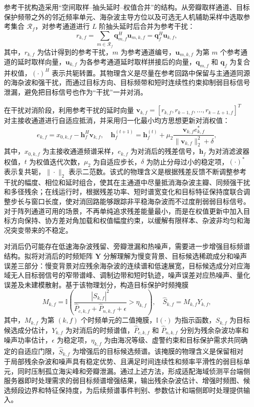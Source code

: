 参考干扰构造采用“空间取样--抽头延时--权值合并”的结构。从旁瓣取样通道、目标保护频带之外的邻近频率单元、海杂波主导方位以及可选无人机辅助采样中选取参考集合 $\mathcal{R}_{f}$，对参考通道进行 $L$ 阶抽头延时后合并为参考干扰：
\begin{equation}
	r_{k,f}=\sum_{m\in\mathcal{R}_{f}}\mathbf{q}_{m,f}^{H}\mathbf{u}_{m,k,f}
	=\mathbf{q}_{f}^{H}\mathbf{u}_{k,f},
\end{equation}
其中，$r_{k,f}$ 为估计得到的参考干扰，$m$ 为参考通道编号，$\mathbf{u}_{m,k,f}$ 为第 $m$ 个参考通道的延时取样向量，$\mathbf{u}_{k,f}$ 为各参考通道延时取样拼接后的向量，$\mathbf{q}_{m,f}$ 和 $\mathbf{q}_{f}$ 为复合并权值，$(\cdot)^H$ 表示共轭转置。其物理含义是尽量在参考回路中保留与主通道同源的海杂波和强干扰，而通过目标方向、目标频带和短时连续性约束抑制弱目标信号泄漏，避免把目标信号也作为“干扰”一并对消。

在干扰对消阶段，利用参考干扰的延时向量 $\mathbf{v}_{k,f}=[r_{k,f},r_{k-1,f},\ldots,r_{k-L+1,f}]^T$ 对主接收通道进行自适应抵消，并采用归一化最小均方思想更新对消权值：
\begin{equation}
	e_{k,f}=x_{0,k,f}-\mathbf{h}_{f}^{H}\mathbf{v}_{k,f},\quad
	\mathbf{h}_{f}^{(t+1)}=
	\mathbf{h}_{f}^{(t)}+
	\mu_{2}\frac{\mathbf{v}_{k,f}e_{k,f}^{*}}{\|\mathbf{v}_{k,f}\|_{2}^{2}+\delta},
\end{equation}
其中，$x_{0,k,f}$ 为主接收通道频谱采样，$e_{k,f}$ 为对消后的残差信号，$\mathbf{h}_{f}$ 为对消滤波器权值，$t$ 为权值迭代次数，$\mu_2$ 为自适应步长，$\delta$ 为防止分母过小的稳定项，$(\cdot)^*$ 表示复共轭，$\|\cdot\|_2$ 表示二范数。该式的物理含义是根据残差反馈不断调整参考干扰的幅度、相位和延时组合，使其在主通道中尽量抵消海杂波主瓣、同频强干扰和多径残余；在线运行时，根据残差功率、短时谱宽变化和目标特征保持度联合调整步长与窗口长度，使对消回路能够跟踪非平稳海杂波而不过度削弱弱目标信号。对于阵列通道可用的场景，不再单纯追求残差能量最小，而是在权值更新中加入目标方向保持、协方差对角加载和权值幅度约束，以缓解有限样本、杂波非均匀和海况突变带来的不稳定。

对消后仍可能存在低速海杂波残留、旁瓣泄漏和热噪声，需要进一步增强目标频谱结构。拟将对消后的时频矩阵 $\mathbf{Y}$ 分解理解为慢变背景、目标候选稀疏成分和噪声误差三部分：慢变背景对应残余海杂波的连续谱和低速展宽，目标候选成分对应海域无人目标弱信号的窄带谱峰、调制边带和短时轨迹，噪声误差对应热噪声、量化误差及未建模散射。基于该物理划分，构造目标保护时频掩膜
\begin{equation}
	M_{k,f}=\mathbb{I}\left(
	\frac{|S_{k,f}|^2}{\widehat{P}_{c,k,f}+\widehat{P}_{n,k,f}+\epsilon}
	>\eta_{k,f}
	\right),
	\quad
	\widehat{S}_{k,f}=M_{k,f}Y_{k,f},
\end{equation}
其中，$M_{k,f}$ 为第 $(k,f)$ 个时频单元的二值掩膜，$\mathbb{I}(\cdot)$ 为指示函数，$S_{k,f}$ 为目标候选成分估计，$Y_{k,f}$ 为对消后的时频谱值，$\widehat{P}_{c,k,f}$ 和 $\widehat{P}_{n,k,f}$ 分别为残余杂波功率和噪声功率估计，$\epsilon$ 为稳定项，$\eta_{k,f}$ 为由海况等级、虚警约束和目标保护需求共同确定的自适应门限，$\widehat{S}_{k,f}$ 为增强后的目标候选频谱。该掩膜的物理含义是保留相对于局部残余杂波和噪声具有稳定优势、且满足时间连续性和频率平滑性的弱目标单元，同时压制孤立海尖峰和旁瓣泄漏。通过上述方法，形成适配海域侦测平台端侧服务器即时处理需求的弱目标频谱增强结果，输出残余杂波估计、增强时频图、候选频段边界和特征保持度，为后续频谱事件判别、参数估计和端侧即时处理提供输入。

